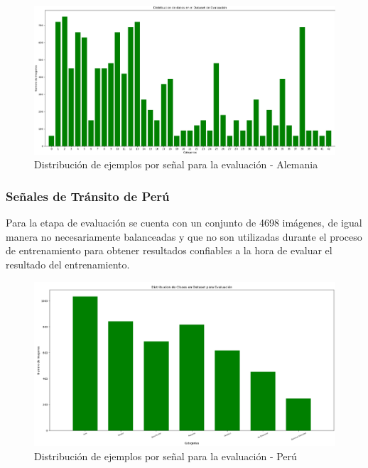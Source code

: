 		\begin{figure}[H]
			\includegraphics[width=1\textwidth]{images/desarrollo/histograms/initialTest12630}
			\begin{center}
			\caption{\small{Distribución de ejemplos por señal para la evaluación - Alemania}}
			{\small{\fontsize{10}{16.8}\selectfont {Fuente: Elaboración propia}}}
			\end{center}
			\vspace{-1.5em}
		\end{figure}

		\subsubsection{Señales de Tránsito de Perú}
		Para la etapa de evaluación se cuenta con un conjunto de 4698 imágenes, de igual manera no necesariamente balanceadas y que no son utilizadas durante el proceso de entrenamiento para obtener resultados confiables a la hora de evaluar el resultado del entrenamiento. 

		\begin{figure}[H]
			\includegraphics[width=1\textwidth]{images/desarrollo/histograms/PeruinitialTest4698}
			\begin{center}
			\caption{\small{Distribución de ejemplos por señal para la evaluación - Perú}}
			{\small{\fontsize{10}{16.8}\selectfont {Fuente: Elaboración propia}}}
			\end{center}
			\vspace{-1.5em}
		\end{figure}

